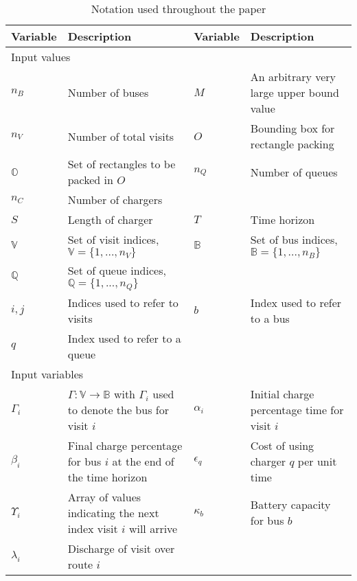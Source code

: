 \begin{table*}[!t]
	\caption{Notation used throughout the paper}
	\label{tab:variables}
	\centering
	\begin{tabular}{l l l l}
		\toprule
		\textbf{Variable} & \textbf{Description} & \textbf{Variable} & \textbf{Description} \\
		\toprule
		\multicolumn{4}{l}{Input values}                                  \\
			$n_B$         & Number of buses                     &
			$M$           & An arbitrary very large upper bound value \\
			$n_V$           & Number of total visits                    &
			$O$           & Bounding box for rectangle packing        \\
			$\mathbb{O}$ & Set of rectangles to be packed in $O$     &
			$n_Q$           & Number of queues                        \\
			$n_C$ 			& Number of chargers \\
			$S$           & Length of charger                         &
			$T$           & Time horizon                              \\
			$\mathbb{V}$  & Set of visit indices, $\mathbb{V} = \{1, ..., n_V\}$ 			  &
			$\mathbb{B}$  & Set of bus indices, $\mathbb{B} = \{1, ..., n_B\}$ 			 \\
			$\mathbb{Q}$  & Set of queue indices, $\mathbb{Q} = \{1, ..., n_Q\}$ \\
			$i,j$      	& Indices used to refer to visits &
			$b$ 		& Index used to refer to a bus \\
			$q$ 		& Index used to refer to a queue \\
		\hline
		\multicolumn{4}{l}{Input variables} \\
			$\Gamma_i$   & $\Gamma: \mathbb{V} \rightarrow \mathbb{B}$ with $\Gamma_i$ used to denote the bus for visit $i$                                   &
			$\alpha_i$   & Initial charge percentage time for visit $i$                       \\
			$\beta_i$    & Final charge percentage for bus $i$ at the end of the time horizon &
			$\epsilon_q$ & Cost of using charger $q$ per unit time                            \\
			$\Upsilon_i$   & Array of values indicating the next index visit $i$ will arrive    &
			$\kappa_b$   & Battery capacity for bus $b$                                       \\
			$\lambda_i$  & Discharge of visit over route $i$                                  &

\end{tabular}
\end{table*}
